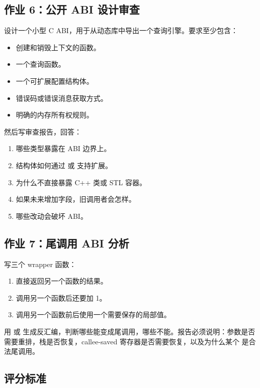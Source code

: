 \begin{exercisebox}
\subsection*{作业 6：公开 ABI 设计审查}

设计一个小型 C ABI，用于从动态库中导出一个查询引擎。要求至少包含：

\begin{itemize}
  \item 创建和销毁上下文的函数。
  \item 一个查询函数。
  \item 一个可扩展配置结构体。
  \item 错误码或错误消息获取方式。
  \item 明确的内存所有权规则。
\end{itemize}

然后写审查报告，回答：

\begin{enumerate}
  \item 哪些类型暴露在 ABI 边界上。
  \item 结构体如何通过  或  支持扩展。
  \item 为什么不直接暴露 C++ 类或 STL 容器。
  \item 如果未来增加字段，旧调用者会怎样。
  \item 哪些改动会破坏 ABI。
\end{enumerate}

\subsection*{作业 7：尾调用 ABI 分析}

写三个 wrapper 函数：

\begin{enumerate}
  \item 直接返回另一个函数的结果。
  \item 调用另一个函数后还要加 1。
  \item 调用另一个函数前后使用一个需要保存的局部值。
\end{enumerate}

用  或  生成反汇编，判断哪些能变成尾调用，哪些不能。报告必须说明：参数是否需要重排，栈是否恢复，callee-saved 寄存器是否需要恢复，以及为什么某个  是合法尾调用。

\subsection*{评分标准}


\end{exercisebox}
